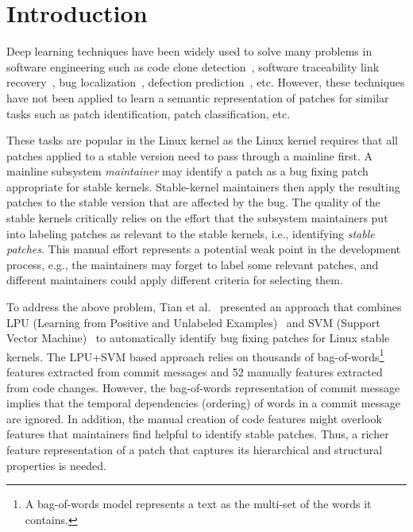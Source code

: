 \vspace{-0.25cm}
\section{Introduction}
\label{sec:intro}

Deep learning techniques have been widely used to solve many problems in software engineering such as code clone detection~\cite{white2016deep,li2017cclearner}, software traceability link recovery~\cite{guo2017semantically}, bug localization~\cite{huo2016learning, lam2017bug}, defection prediction~\cite{yang2015deep, wang2016automatically}, etc. However, these techniques have not been applied to learn a semantic representation of patches for similar tasks such as patch identification, patch classification, etc. 

These tasks are popular in the Linux kernel as the Linux kernel requires that all patches applied to a stable version need to pass through a mainline first. A mainline subsystem \textit{maintainer} may identify a patch as a bug fixing patch appropriate for stable kernels. Stable-kernel maintainers then apply the resulting patches to the stable version that are affected by the bug. The quality of the stable kernels critically relies on the effort that the subsystem maintainers put into labeling patches as relevant to the stable kernels, i.e., identifying \textit{stable patches}. This manual
effort represents a potential weak point in the development process, e.g., the maintainers may forget to label some relevant patches, and different maintainers could apply different criteria for selecting them.

To address the above problem, Tian et al.~\cite{tian2012identifying} presented an approach that combines LPU (Learning from Positive and Unlabeled Examples)~\cite{letouzey2000learning} and SVM (Support Vector Machine)~\cite{suykens1999least} to automatically identify bug fixing patches for Linux stable kernels. The LPU+SVM based approach relies on thousands of bag-of-words\footnote{A bag-of-words model represents a text as the multi-set of the words it contains.} features extracted from commit messages and 52 manually features extracted from code changes. However, the bag-of-words representation of commit message implies that the temporal dependencies (ordering) of words in a commit message are ignored. In addition, the manual creation of code features might overlook features that maintainers find helpful to identify stable patches. Thus, a richer feature representation of a patch that captures its hierarchical and structural properties is needed.

